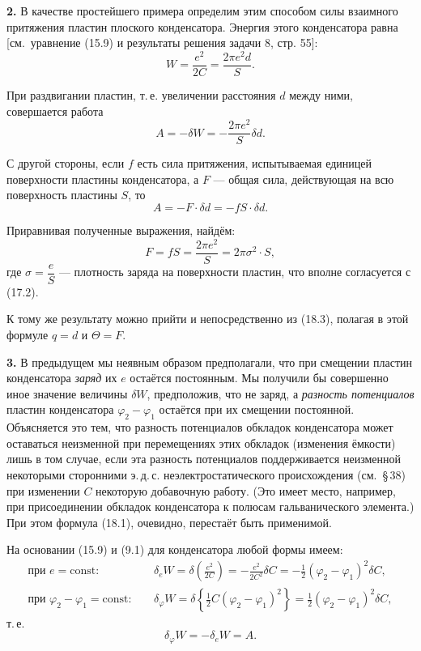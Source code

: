 \documentclass[a4paper,12pt]{article}
\begin{document}
\textbf{2.} В качестве простейшего примера определим этим способом
силы взаимного притяжения пластин плоского конденсатора. Энергия
этого конденсатора равна [см.\ уравнение (15.9) и результаты решения
задачи 8, стр. 55]:
$$
    W = \frac{e^2}{2C} = \frac{2\pi e^2 d}{S}.
$$

При раздвигании пластин, т.\,е. увеличении расстояния $d$ между
ними, совершается работа
$$
    A = -\delta W = -\frac{2\pi e^2}{S}\delta d.
$$

С другой стороны, если $f$ есть сила притяжения, испытываемая
единицей поверхности пластины конденсатора, а $F$ — общая сила,
действующая на всю поверхность пластины $S$, то
$$
    A = -F\cdot\delta d = -fS\cdot\delta d.
$$


Приравнивая полученные выражения, найдём:
$$
    F = fS = \frac{2\pi e^2}{S} = 2\pi\sigma^2\cdot S,
$$
где $\sigma = \dfrac{e}{S}$ — плотность заряда на поверхности пластин,
что вполне согласуется с (17.2).

К тому же результату можно прийти и непосредственно из (18.3),
полагая в этой формуле $q = d$ и $\Theta = F$.

\textbf{3.} В предыдущем мы неявным образом предполагали, что при
смещении пластин конденсатора \textit{заряд} их $e$ остаётся
постоянным. Мы получили бы совершенно иное значение величины $\delta W$,
предположив, что не заряд, а \textit{разность потенциалов} пластин
конденсатора $\varphi_2 - \varphi_1$ остаётся при их смещении
постоянной. Объясняется это тем, что разность потенциалов обкладок
конденсатора может оставаться неизменной при перемещениях этих обкладок
(изменения ёмкости) лишь в том случае, если эта разность потенциалов
поддерживается неизменной некоторыми сторонними э.\,д.\,с.
неэлектростатического происхождения (см.\ §\,38) при изменении $C$
некоторую добавочную работу. (Это имеет место, например, при
присоединении обкладок конденсатора к полюсам гальванического
элемента.) При этом формула (18.1), очевидно, перестаёт быть применимой.

На основании (15.9) и (9.1) для конденсатора любой формы имеем:
\begin{align*}
    \text{при } e = \text{const}: \quad
    &\delta_e W = \delta\!\left(\frac{e^2}{2C}\right)
               = -\frac{e^2}{2C^2}\delta C
               = -\frac{1}{2}(\varphi_2 - \varphi_1)^2\delta C, \\
    \text{при } \varphi_2 - \varphi_1 = \text{const}: \quad
    &\delta_\varphi W = \delta\!\left\{\frac{1}{2}C(\varphi_2 - \varphi_1)^2\right\}
               = \frac{1}{2}(\varphi_2 - \varphi_1)^2\delta C,
\end{align*}
т.\,е.
\begin{equation}
    \delta_\varphi W = -\delta_e W = A.
    \tag{18.4}
\end{equation}
\end{document}
